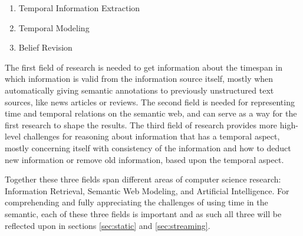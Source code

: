 \documentclass{llncs}
\begin{document}
\begin{enumerate}
\item Temporal Information Extraction
\item Temporal Modeling
\item Belief Revision
\end{enumerate}

The first field of research is needed to get information about the timespan in which information is valid from the information source itself, mostly when automatically giving semantic annotations to previously unstructured text sources, like news articles or reviews. The second field is needed for representing time and temporal relations on the semantic web, and can serve as a way for the first research to shape the results. The third field of research provides more high-level challenges for reasoning about information that has a temporal aspect, mostly concerning itself with consistency of the information and how to deduct new information or remove old information, based upon the temporal aspect.

Together these three fields span different areas of computer science research: Information Retrieval, Semantic Web Modeling, and Artificial Intelligence. For comprehending and fully appreciating the challenges of using time in the semantic, each of these three fields is important and as such all three will be reflected upon in sections \ref{sec:static} and \ref{sec:streaming}.

\end{document}
